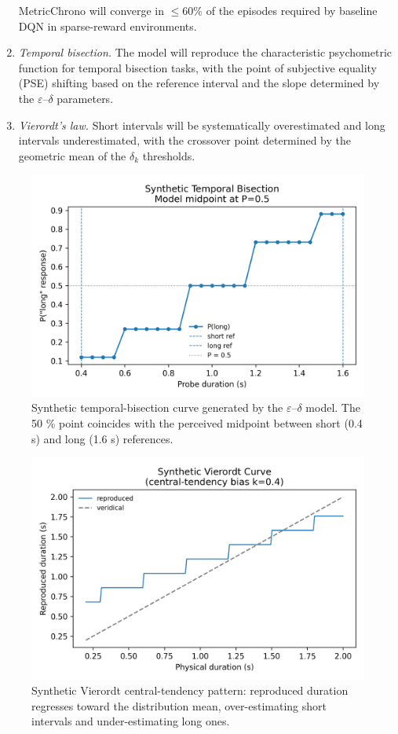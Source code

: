 \documentclass[preprint,11pt]{elsarticle}
\begin{document}
\begin{enumerate}[label=\textbf{P\arabic*}]
    MetricChrono will converge in $\le\!60\%$ of the episodes required by
    baseline DQN in sparse-reward environments.
    \item \label{pred:bisection} \emph{Temporal bisection.} The model will reproduce the characteristic psychometric function for temporal bisection tasks, with the point of subjective equality (PSE) shifting based on the reference interval and the slope determined by the $\varepsilon$--$\delta$ parameters.
    \item \label{pred:vierordt} \emph{Vierordt's law.} Short intervals will be systematically overestimated and long intervals underestimated, with the crossover point determined by the geometric mean of the $\delta_k$ thresholds.
\end{enumerate}

\begin{figure}[ht]
  \centering
  \includegraphics[width=.65\linewidth]{figures/temporal_bisection.png}
  \caption{Synthetic temporal-bisection curve generated by the $\varepsilon$–$\delta$ model.
           The 50 \% point coincides with the perceived midpoint between
           short (0.4 s) and long (1.6 s) references.}
  \label{fig:temporal_bisection}
\end{figure}

\begin{figure}[ht]
  \centering
  \includegraphics[width=.65\linewidth]{figures/vierordt_bias.png}
  \caption{Synthetic Vierordt central-tendency pattern: reproduced duration
           regresses toward the distribution mean, over-estimating short
           intervals and under-estimating long ones.}
  \label{fig:vierordt_bias}
\end{figure}
\end{document}

